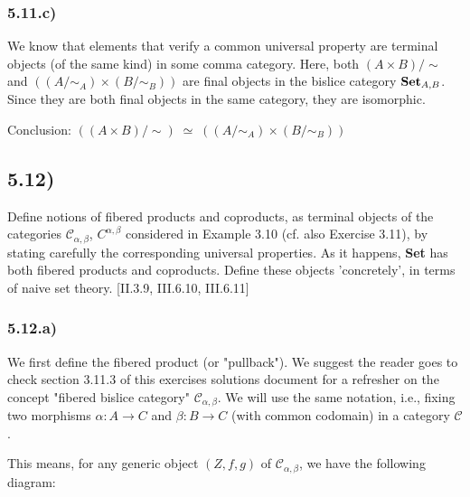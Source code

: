 \documentclass[12pt, letterpaper, twoside]{report}
\begin{document}
\subsubsection*{5.11.c)}

We know that elements that verify a common universal property are terminal objects (of the same kind) in some comma category. Here, both $(A \times B)/ \sim$ and $((A / \sim_A) \times (B / \sim_B))$ are final objects in the bislice category $\text{\textbf{Set}}_{A,B}$. Since they are both final objects in the same category, they are isomorphic.

Conclusion: $((A \times B)/ \sim) \; \simeq \; ((A / \sim_A) \times (B / \sim_B))$



\subsection*{5.12)}

Define notions of fibered products and coproducts, as terminal objects of the categories $\mathcal{C}_{\alpha,\beta}$, $C^{\alpha,\beta}$ considered in Example 3.10 (cf. also Exercise 3.11), by stating carefully the corresponding universal properties.
As it happens, \textbf{Set} has both fibered products and coproducts. Define these objects 'concretely', in terms of naive set theory. [II.3.9, III.6.10, III.6.11]


\subsubsection*{5.12.a)}

We first define the fibered product (or "pullback"). We suggest the reader goes to check section 3.11.3 of this exercises solutions document for a refresher on the concept "fibered bislice category" $\mathcal{C}_{\alpha,\beta}$. We will use the same notation, i.e., fixing two morphisms $\alpha : A \to C$ and $\beta : B \to C$ (with common codomain) in a category $\mathcal{C}$.

This means, for any generic object $(Z, f, g)$ of $\mathcal{C}_{\alpha,\beta}$, we have the following diagram:

\end{document}
